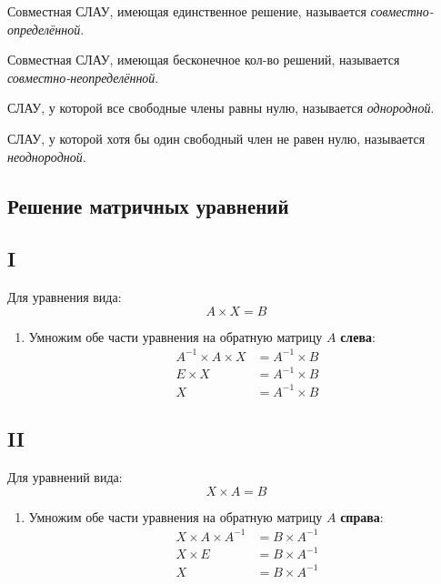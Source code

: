 \begin{definition}
  Совместная СЛАУ, имеющая единственное решение, называется \textit{совместно-определённой}. 
\end{definition}

\begin{definition}
  Совместная СЛАУ, имеющая бесконечное кол-во решений, называется \textit{совместно-неопределённой}.
\end{definition}

\begin{definition}
  СЛАУ, у которой все свободные члены равны нулю, называется \textit{однородной}.
\end{definition}

\begin{definition}
  СЛАУ, у которой хотя бы один свободный член не равен нулю, называется \textit{неоднородной}.
\end{definition}

\subsection{Решение матричных уравнений}

\subsection*{I}

Для уравнения вида: \[
A \times X = B
\] 
\begin{enumerate}
  \item Умножим обе части уравнения на обратную матрицу $A$ \textbf{слева}:
    \begin{align*}
      A^{-1} \times A \times X &= A^{-1} \times B \\
      E \times X &= A^{-1} \times B \\
      X &= A^{-1} \times  B
    \end{align*}
\end{enumerate}

\subsection*{II}

Для уравнений вида: \[
X \times A = B
\] 
\begin{enumerate}
  \item Умножим обе части уравнения на обратную матрицу $A$ \textbf{справа}:
    \begin{align*}
      X \times A \times A^{-1} &= B \times A^{-1} \\
      X \times E &= B \times A^{-1} \\
      X &= B \times A^{-1} \\
    \end{align*}
\end{enumerate}

